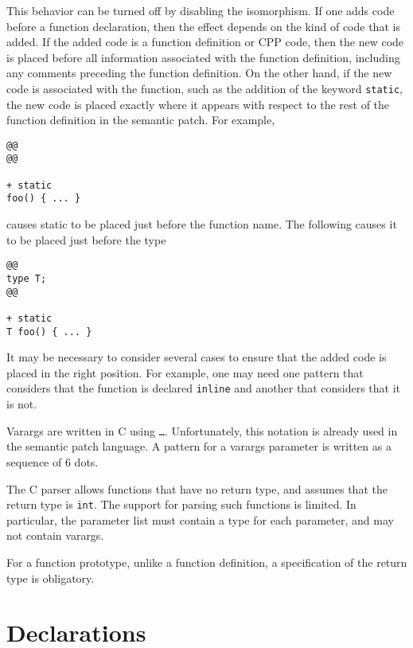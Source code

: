 \noindent
This behavior can be turned off by disabling the 
isomorphism.  If one adds code before a function declaration, then the
effect depends on the kind of code that is added.  If the added code is a
function definition or CPP code, then the new code is placed before
all information associated with the function definition, including any
comments preceding the function definition.  On the other hand, if the new
code is associated with the function, such as the addition of the keyword
{\tt static}, the new code is placed exactly where it appears with respect
to the rest of the function definition in the semantic patch.  For example,

\begin{lstlisting}[language=Cocci]
@@
@@

+ static
foo() { ... }
\end{lstlisting}

\noindent
causes static to be placed just before the function name.  The following
causes it to be placed just before the type

\begin{lstlisting}[language=Cocci]
@@
type T;
@@

+ static
T foo() { ... }
\end{lstlisting}

\noindent
It may be necessary to consider several cases to ensure that the added code
is placed in the right position.  For example, one may need one pattern
that considers that the function is declared {\tt inline} and another that
considers that it is not.

Varargs are written in C using {\tt \ldots}.  Unfortunately, this notation
is already used in the semantic patch language.  A pattern for a varargs
parameter is written as a sequence of 6 dots.

The C parser allows functions that have no return type, and assumes that
the return type is \texttt{int}.  The support for parsing such functions is
limited.  In particular, the parameter list must contain a type for each
parameter, and may not contain varargs.

For a function prototype, unlike a function definition, a specification of
the return type is obligatory.


\section{Declarations}

